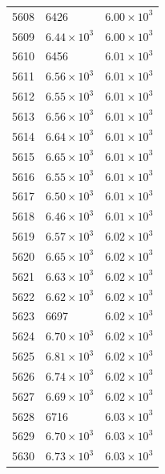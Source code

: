 \begin{table}[H]
\begin{tabular}{lll}
5608 & 6426 & $\displaystyle 6.00 \times 10^{3}$ \\
5609 & $\displaystyle 6.44 \times 10^{3}$ & $\displaystyle 6.00 \times 10^{3}$ \\
5610 & 6456 & $\displaystyle 6.01 \times 10^{3}$ \\
5611 & $\displaystyle 6.56 \times 10^{3}$ & $\displaystyle 6.01 \times 10^{3}$ \\
5612 & $\displaystyle 6.55 \times 10^{3}$ & $\displaystyle 6.01 \times 10^{3}$ \\
5613 & $\displaystyle 6.56 \times 10^{3}$ & $\displaystyle 6.01 \times 10^{3}$ \\
5614 & $\displaystyle 6.64 \times 10^{3}$ & $\displaystyle 6.01 \times 10^{3}$ \\
5615 & $\displaystyle 6.65 \times 10^{3}$ & $\displaystyle 6.01 \times 10^{3}$ \\
5616 & $\displaystyle 6.55 \times 10^{3}$ & $\displaystyle 6.01 \times 10^{3}$ \\
5617 & $\displaystyle 6.50 \times 10^{3}$ & $\displaystyle 6.01 \times 10^{3}$ \\
5618 & $\displaystyle 6.46 \times 10^{3}$ & $\displaystyle 6.01 \times 10^{3}$ \\
5619 & $\displaystyle 6.57 \times 10^{3}$ & $\displaystyle 6.02 \times 10^{3}$ \\
5620 & $\displaystyle 6.65 \times 10^{3}$ & $\displaystyle 6.02 \times 10^{3}$ \\
5621 & $\displaystyle 6.63 \times 10^{3}$ & $\displaystyle 6.02 \times 10^{3}$ \\
5622 & $\displaystyle 6.62 \times 10^{3}$ & $\displaystyle 6.02 \times 10^{3}$ \\
5623 & 6697 & $\displaystyle 6.02 \times 10^{3}$ \\
5624 & $\displaystyle 6.70 \times 10^{3}$ & $\displaystyle 6.02 \times 10^{3}$ \\
5625 & $\displaystyle 6.81 \times 10^{3}$ & $\displaystyle 6.02 \times 10^{3}$ \\
5626 & $\displaystyle 6.74 \times 10^{3}$ & $\displaystyle 6.02 \times 10^{3}$ \\
5627 & $\displaystyle 6.69 \times 10^{3}$ & $\displaystyle 6.02 \times 10^{3}$ \\
5628 & 6716 & $\displaystyle 6.03 \times 10^{3}$ \\
5629 & $\displaystyle 6.70 \times 10^{3}$ & $\displaystyle 6.03 \times 10^{3}$ \\
5630 & $\displaystyle 6.73 \times 10^{3}$ & $\displaystyle 6.03 \times 10^{3}$ \\

\end{tabular}
\end{table}
